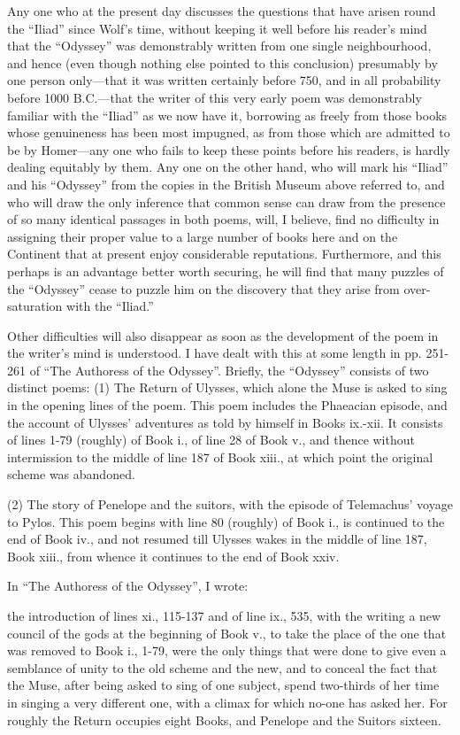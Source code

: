 Any one who at the present day discusses the questions that have arisen round
the “Iliad” since Wolf’s time, without keeping it well before his reader’s mind
that the “Odyssey” was demonstrably written from one single neighbourhood, and
hence (even though nothing else pointed to this conclusion) presumably by one
person only—that it was written certainly before 750, and in all probability
before 1000 B.C.—that the writer of this very early poem was demonstrably
familiar with the “Iliad” as we now have it, borrowing as freely from those
books whose genuineness has been most impugned, as from those which are
admitted to be by Homer—any one who fails to keep these points before his
readers, is hardly dealing equitably by them. Any one on the other hand, who
will mark his “Iliad” and his “Odyssey” from the copies in the British Museum
above referred to, and who will draw the only inference that common sense can
draw from the presence of so many identical passages in both poems, will, I
believe, find no difficulty in assigning their proper value to a large number
of books here and on the Continent that at present enjoy considerable
reputations. Furthermore, and this perhaps is an advantage better worth
securing, he will find that many puzzles of the “Odyssey” cease to puzzle him
on the discovery that they arise from over-saturation with the “Iliad.”

Other difficulties will also disappear as soon as the development of the poem
in the writer’s mind is understood. I have dealt with this at some length in
pp. 251-261 of “The Authoress of the Odyssey”. Briefly, the “Odyssey” consists
of two distinct poems: (1) The Return of Ulysses, which alone the Muse is asked
to sing in the opening lines of the poem. This poem includes the Phaeacian
episode, and the account of Ulysses’ adventures as told by himself in Books
ix.-xii. It consists of lines 1-79 (roughly) of Book i., of line 28 of Book v.,
and thence without intermission to the middle of line 187 of Book xiii., at
which point the original scheme was abandoned.

(2) The story of Penelope and the suitors, with the episode of Telemachus’
voyage to Pylos. This poem begins with line 80 (roughly) of Book i., is
continued to the end of Book iv., and not resumed till Ulysses wakes in the
middle of line 187, Book xiii., from whence it continues to the end of Book
xxiv.

In “The Authoress of the Odyssey”, I wrote:

the introduction of lines xi., 115-137 and of line ix., 535, with the writing a
new council of the gods at the beginning of Book v., to take the place of the
one that was removed to Book i., 1-79, were the only things that were done to
give even a semblance of unity to the old scheme and the new, and to conceal
the fact that the Muse, after being asked to sing of one subject, spend
two-thirds of her time in singing a very different one, with a climax for which
no-one has asked her. For roughly the Return occupies eight Books, and Penelope
and the Suitors sixteen.

